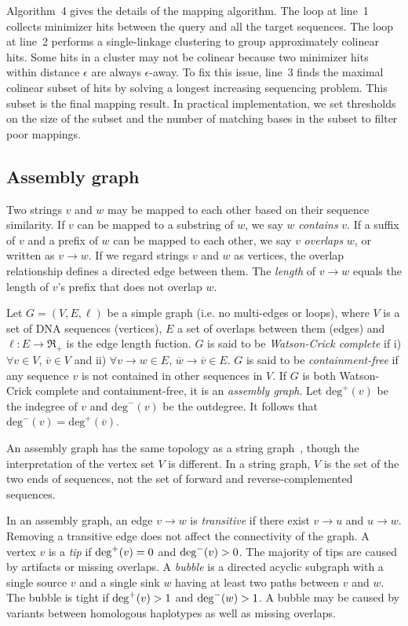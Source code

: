 \documentclass{bioinfo}
\begin{document}
\begin{methods}
Algorithm~4 gives the details of the mapping algorithm. The loop at line~1
collects minimizer hits between the query and all the target sequences. The
loop at line~2 performs a single-linkage clustering to group approximately
colinear hits. Some hits in a cluster may not be colinear because two minimizer
hits within distance $\epsilon$ are always $\epsilon$-away. To fix this issue,
line~3 finds the maximal colinear subset of hits by solving a longest
increasing sequencing problem. This subset is the final mapping result. In
practical implementation, we set thresholds on the size of the subset and the
number of matching bases in the subset to filter poor mappings.

\subsection{Assembly graph}

Two strings $v$ and $w$ may be mapped to each other based on their sequence
similarity. If $v$ can be mapped to a substring of $w$, we say $w$
\emph{contains} $v$. If a suffix of $v$ and a prefix of $w$ can be mapped to
each other, we say $v$ \emph{overlaps} $w$, or written as $v\to w$.
If we regard strings $v$ and $w$ as vertices, the overlap relationship defines
a directed edge between them. The \emph{length} of $v\to w$ equals the length
of $v$'s prefix that does not overlap $w$.

Let $G=(V,E,\ell)$ be a simple graph (i.e. no multi-edges or loops), where $V$ is a
set of DNA sequences (vertices), $E$ a set of overlaps between them (edges) and
$\ell:E\to\Re_+$ is the edge length fuction. $G$ is said to be
\emph{Watson-Crick complete} if i) $\forall v\in V$, $\overline{v}\in V$ and
ii) $\forall v\to w\in E$, $\overline{w}\to\overline{v}\in E$. $G$ is said to
be \emph{containment-free} if any sequence $v$ is not contained in other
sequences in $V$. If $G$ is both Watson-Crick complete and containment-free, it
is an \emph{assembly graph}. Let $\mathrm{deg}^+(v)$ be the indegree of $v$ and
$\mathrm{deg}^-(v)$ be the outdegree. It follows that
$\mathrm{deg}^-(v)=\mathrm{deg}^+(\overline{v})$.

An assembly graph has the same topology as a string graph~\citep{Myers:2005bh},
though the interpretation of the vertex set $V$ is different. In a string
graph, $V$ is the set of the two ends of sequences, not the set of forward and
reverse-complemented sequences.

In an assembly graph, an edge $v\to w$ is \emph{transitive} if there exist
$v\to u$ and $u\to w$. Removing a transitive edge does not affect the
connectivity of the graph. A vertex $v$ is a \emph{tip} if ${\rm deg}^+(v)=0$
and ${\rm deg}^-(v)>0$. The majority of tips are caused by artifacts or missing
overlaps. A \emph{bubble} is a directed acyclic subgraph with a single source
$v$ and a single sink $w$ having at least two paths between $v$ and $w$. The
bubble is tight if ${\rm deg}^+(v)>1$ and ${\rm deg}^-(w)>1$. A bubble may be
caused by variants between homologous haplotypes as well as missing overlaps.


\end{methods}
\end{document}
